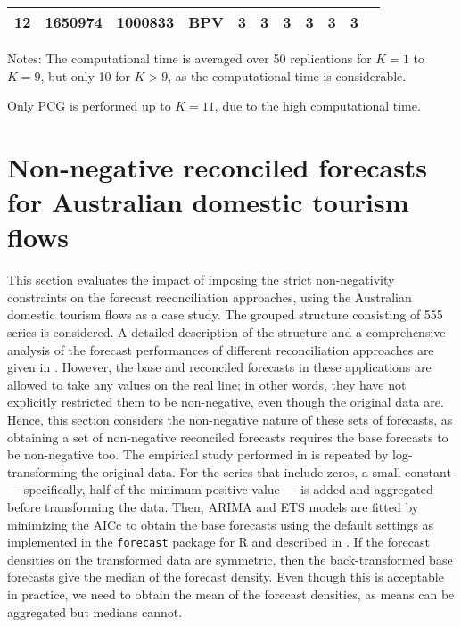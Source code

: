\documentclass[11pt]{article}
\newcommand{\0}{\phantom{0}}
\begin{document}
\begin{table}[ht]
\begin{threeparttable}
\begin{tabular}{llllrrrrrrr}
			\midrule
			12 & 1650974 & 1000833 & BPV & 3 & 3 & 3 & 3 & 3 & 3 & \pmb{$3247.09$}\\
			\bottomrule
		\end{tabular}
		\begin{tablenotes} 
			\item [] Notes: The computational time is averaged over 50 replications for $K = 1$ to $K = 9$, but only 10 for $K > 9$, as the computational time is considerable.
			\item [] Only PCG is performed up to $K = 11$, due to the high computational time.	
		\end{tablenotes}
	\end{threeparttable}
\end{table}

\clearpage

\section{Non-negative reconciled forecasts for Australian domestic tourism flows}
\label{sec:AUSNN}
This section evaluates the impact of imposing the strict non-negativity constraints on the forecast reconciliation approaches, using the Australian domestic tourism flows as a case study. The grouped structure consisting of 555 series is considered. A detailed description of the structure and a comprehensive analysis of the forecast performances of different reconciliation approaches are given in \citet{Wick2018}. However, the base and reconciled forecasts in these applications are allowed to take any values on the real line; in other words, they have not explicitly restricted them to be non-negative, even though the original data are. Hence, this section considers the non-negative nature of these sets of forecasts, as obtaining a set of non-negative reconciled forecasts requires the base forecasts to be non-negative too. The empirical study performed in \citet{Wick2018} is repeated by log-transforming the original data. For the series that include zeros, a small constant --- specifically, half of the minimum positive value --- is added and aggregated before transforming the data. Then, ARIMA and ETS models are fitted by minimizing the AICc to obtain the base forecasts using the default settings as implemented in the \texttt{forecast} package for R \citet{forecast2016} and described in \citet{Hyndman2008}. If the forecast densities on the transformed data are symmetric, then the back-transformed base forecasts give the median of the forecast density. Even though this is acceptable in practice, we need to obtain the mean of the forecast densities, as means can be aggregated but medians cannot.
\end{document}
